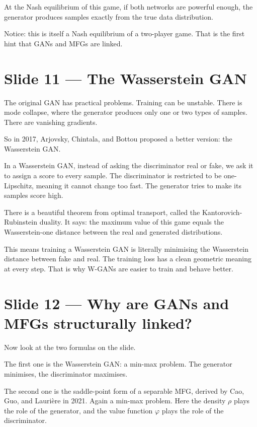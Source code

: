 \documentclass[11pt]{article}
\begin{document}
At the Nash equilibrium of this game, if both networks are powerful
enough, the generator produces samples exactly from the true data
distribution.

Notice: this is itself a Nash equilibrium of a two-player game.  That is
the first hint that GANs and MFGs are linked.

\section*{Slide 11 --- The Wasserstein GAN}

The original GAN has practical problems.  Training can be unstable.
There is mode collapse, where the generator produces only one or two
types of samples.  There are vanishing gradients.

So in 2017, Arjovsky, Chintala, and Bottou proposed a better version:
the Wasserstein GAN.

In a Wasserstein GAN, instead of asking the discriminator real or fake,
we ask it to assign a score to every sample.  The discriminator is
restricted to be one-Lipschitz, meaning it cannot change too fast.  The
generator tries to make its samples score high.

There is a beautiful theorem from optimal transport, called the
Kantorovich-Rubinstein duality.  It says: the maximum value of this game
equals the Wasserstein-one distance between the real and generated
distributions.

This means training a Wasserstein GAN is literally minimising the
Wasserstein distance between fake and real.  The training loss has a
clean geometric meaning at every step.  That is why W-GANs are easier
to train and behave better.

\section*{Slide 12 --- Why are GANs and MFGs structurally linked?}

Now look at the two formulas on the slide.

The first one is the Wasserstein GAN: a min-max problem.  The generator
minimises, the discriminator maximises.

The second one is the saddle-point form of a separable MFG, derived by
Cao, Guo, and Lauri\`ere in 2021.  Again a min-max problem.  Here the
density $\rho$ plays the role of the generator, and the value function
$\varphi$ plays the role of the discriminator.
\end{document}
